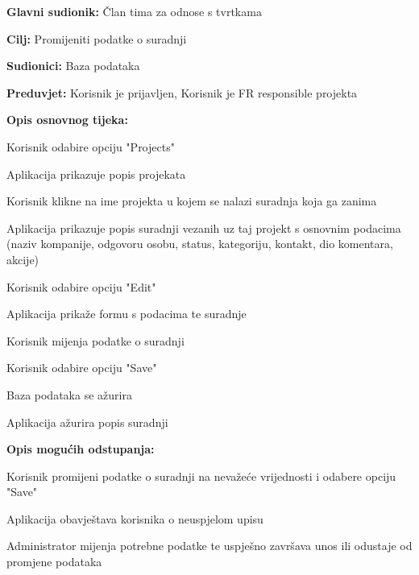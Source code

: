 					\noindent {}
					\begin{packed_item}

						\item \textbf{Glavni sudionik:} Član tima za odnose s tvrtkama
						\item \textbf{Cilj:} Promijeniti podatke o suradnji
						\item \textbf{Sudionici:} Baza podataka
						\item \textbf{Preduvjet:} Korisnik je prijavljen, Korisnik je FR responsible projekta
						\item \textbf{Opis osnovnog tijeka:}

						\item[] \begin{packed_enum}

							\item Korisnik odabire opciju "Projects"
							\item Aplikacija prikazuje popis projekata
							\item Korisnik klikne na ime projekta u kojem se nalazi suradnja koja ga zanima
							\item Aplikacija prikazuje popis suradnji vezanih uz taj projekt s osnovnim podacima (naziv kompanije, odgovoru osobu, status, kategoriju, kontakt, dio komentara, akcije)
							\item Korisnik odabire opciju "Edit"
							\item Aplikacija prikaže formu s podacima te suradnje
							\item Korisnik mijenja podatke o suradnji
							\item Korisnik odabire opciju "Save"
							\item Baza podataka se ažurira
							\item Aplikacija ažurira popis suradnji

						\end{packed_enum}
						
						\item \textbf{Opis mogućih odstupanja:}

						\item[] \begin{packed_item}

							\item[7.a] Korisnik promijeni podatke o suradnji na nevažeće vrijednosti
							i odabere opciju "Save"
							
							\item[] \begin{packed_enum}

								\item Aplikacija obavještava korisnika o neuspjelom upisu
								\item Administrator mijenja potrebne podatke te uspješno završava unos ili
								odustaje od promjene podataka

							\end{packed_enum}

						\end{packed_item}
						
					\end{packed_item}

